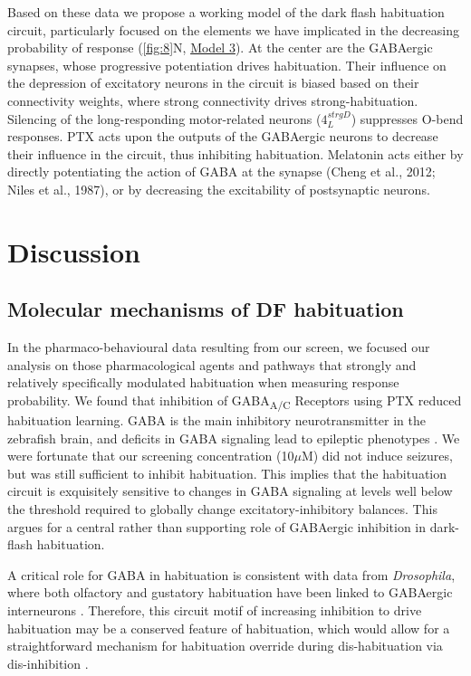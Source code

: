 \documentclass[9pt,lineno]{RandlettLab_elife}
\begin{document}
\begin{description}
\end{description}


Based on these data we propose a working model of the dark flash habituation circuit, particularly focused on the elements we have implicated in the decreasing probability of response (\autoref{fig:8}N, \underline{Model 3}). At the center are the GABAergic synapses, whose progressive potentiation drives habituation. Their influence on the depression of excitatory neurons in the circuit is biased based on their connectivity weights, where strong connectivity drives strong-habituation. Silencing of the long-responding motor-related neurons ($4_{L}^{strgD}$) suppresses O-bend responses. PTX acts upon the outputs of the GABAergic neurons to decrease their influence in the circuit, thus inhibiting habituation. Melatonin acts either by directly potentiating the action of GABA at the synapse (Cheng et al., 2012; Niles et al., 1987), or by decreasing the excitability of postsynaptic neurons. 

\section{Discussion}
\subsection{Molecular mechanisms of DF habituation}

In the pharmaco-behavioural data resulting from our screen, we focused our analysis on those pharmacological agents and pathways that strongly and relatively specifically modulated habituation when measuring response probability. We found that inhibition of GABA\textsubscript{A/C} Receptors using PTX reduced habituation learning. GABA is the main inhibitory neurotransmitter in the zebrafish brain, and deficits in GABA signaling lead to epileptic phenotypes \cite{Baraban2005-xq}. We were fortunate that our screening concentration (10$\mu$M) did not induce seizures, but was still sufficient to inhibit habituation. This implies that the habituation circuit is exquisitely sensitive to changes in GABA signaling at levels well below the threshold required to globally change excitatory-inhibitory balances. This argues for a central rather than supporting role of GABAergic inhibition in dark-flash habituation. 

A critical role for GABA in habituation is consistent with data from \emph{Drosophila}, where both olfactory and gustatory habituation have been linked to GABAergic interneurons \cite{Das2011-gd, Paranjpe2012-ce,Trisal2022-pa}. Therefore, this circuit motif of increasing inhibition to drive habituation may be a conserved feature of habituation, which would allow for a straightforward mechanism for habituation override during dis-habituation via dis-inhibition \cite{Cooke2020-mz, Trisal2022-pa}. 
\end{document}
